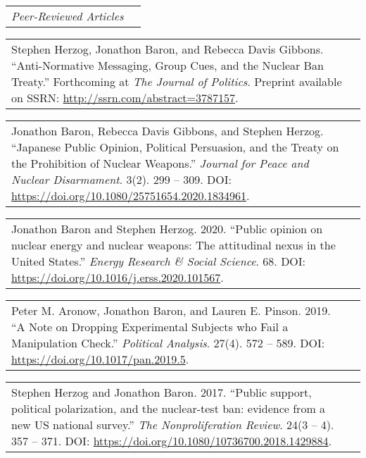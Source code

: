 \documentclass[11pt]{article}
\begin{document}
\vspace{0.13in}

\begin{tabular*}{7.1in}{p{6.925in}p{3cm}}
{\large {\emph{Peer-Reviewed Articles}}}
\end{tabular*} 

\vspace{0.13in}

\begin{tabular*}{7.1in}{p{6.925in}p{3cm}}
Stephen Herzog, Jonathon Baron, and Rebecca Davis Gibbons. ``Anti-Normative Messaging, Group Cues, and the Nuclear Ban Treaty.'' Forthcoming at \textit{The Journal of Politics}. Preprint available on SSRN: \url{http://ssrn.com/abstract=3787157}.
\end{tabular*}

\vspace{0.13in}

\begin{tabular*}{7.1in}{p{6.925in}p{3cm}}
Jonathon Baron, Rebecca Davis Gibbons, and Stephen Herzog. ``Japanese Public Opinion, Political Persuasion, and the Treaty on the Prohibition of Nuclear Weapons.'' \textit{Journal for Peace and Nuclear Disarmament}. 3(2). 299 -- 309. DOI: \url{https://doi.org/10.1080/25751654.2020.1834961}.
\end{tabular*}

\vspace{0.13in}

\begin{tabular*}{7.1in}{p{6.925in}p{3cm}}
Jonathon Baron and Stephen Herzog. 2020. ``Public opinion on nuclear energy and nuclear weapons: The attitudinal nexus in the United States.'' \textit{Energy Research \& Social Science}. 68. DOI: \url{https://doi.org/10.1016/j.erss.2020.101567}.
\end{tabular*}

\vspace{0.13in}

\begin{tabular*}{7.1in}{p{6.925in}p{3cm}}
Peter M. Aronow, Jonathon Baron, and Lauren E. Pinson. 2019. ``A Note on Dropping Experimental Subjects who Fail a Manipulation Check.'' \textit{Political Analysis}. 27(4). 572 -- 589. DOI: \url{https://doi.org/10.1017/pan.2019.5}.
\end{tabular*}

\vspace{0.13in}

\begin{tabular*}{7.1in}{p{6.925in}p{3cm}}
Stephen Herzog and Jonathon Baron. 2017. ``Public support, political polarization, and the nuclear-test ban: evidence from a new US national survey.'' {\it The Nonproliferation Review}. 24(3 -- 4). 357 -- 371. DOI: \url{https://doi.org/10.1080/10736700.2018.1429884}.
\end{tabular*}
\end{document}
